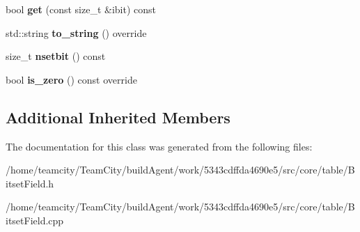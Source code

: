 \begin{DoxyCompactItemize}
\item 
bool {\bfseries get} (const size\+\_\+t \&ibit) const \hypertarget{classBitsetElement_a7040f037eb0e3e34121c8d4d8dc3b8b1}{}\label{classBitsetElement_a7040f037eb0e3e34121c8d4d8dc3b8b1}

\item 
std\+::string {\bfseries to\+\_\+string} () override\hypertarget{classBitsetElement_a4042bdd141b1adbce6d0dbba708655b9}{}\label{classBitsetElement_a4042bdd141b1adbce6d0dbba708655b9}

\item 
size\+\_\+t {\bfseries nsetbit} () const \hypertarget{classBitsetElement_a0af10591a3a0a446fd236dc05ff8f6a1}{}\label{classBitsetElement_a0af10591a3a0a446fd236dc05ff8f6a1}

\item 
bool {\bfseries is\+\_\+zero} () const override\hypertarget{classBitsetElement_a413dedf97cf806401c681acb03dedd26}{}\label{classBitsetElement_a413dedf97cf806401c681acb03dedd26}

\end{DoxyCompactItemize}
\subsection*{Additional Inherited Members}


The documentation for this class was generated from the following files\+:\begin{DoxyCompactItemize}
\item 
/home/teamcity/\+Team\+City/build\+Agent/work/5343cdffda4690e5/src/core/table/Bitset\+Field.\+h\item 
/home/teamcity/\+Team\+City/build\+Agent/work/5343cdffda4690e5/src/core/table/Bitset\+Field.\+cpp\end{DoxyCompactItemize}
